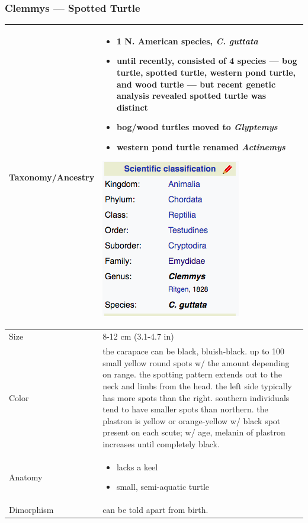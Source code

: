 \subsubsection{Clemmys --- Spotted Turtle}
\begin{center}
\begin{longtabu} to 

	\hline
	Taxonomy/Ancestry &
	\begin{itemize}[noitemsep]
		\item 1 N. American species, \emph{C. guttata}
		\item until recently, consisted of 4 species --- bog turtle, spotted turtle, western pond turtle, and wood turtle --- but recent genetic analysis revealed spotted turtle was distinct
		\item bog/wood turtles moved to \emph{Glyptemys}
		\item western pond turtle renamed \emph{Actinemys}
	\end{itemize}
	\begin{center} \includegraphics[scale=0.5]{testudines/emydidae/clemmys/tax} \end{center}
	 \\
	\hline
	Size & 
	8-12 cm (3.1-4.7 in)
	\\
	\hline
	Color &
	the carapace can be black, bluish-black. up to 100 small yellow round spots w/ the amount depending on range. the spotting pattern extends out to the neck and limbs from the head. the left side typically has more spots than the right. southern individuals tend to have smaller spots than northern. the plastron is yellow or orange-yellow w/ black spot present on each scute; w/ age, melanin of plastron increases until completely black.
	 \\
	\hline
	Anatomy &
	\begin{itemize}[noitemsep]
		\item lacks a keel
		\item small, semi-aquatic turtle
	\end{itemize}
	 \\
	\hline
	Dimorphism & 
	can be told apart from birth.
	

\end{longtabu}
\end{center}
